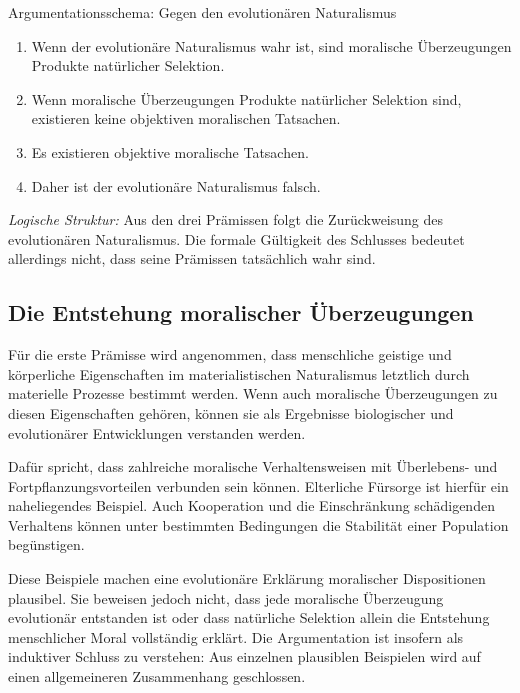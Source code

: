 \documentclass[a4paper,11pt]{article}
\begin{document}
	\begin{mathbox}{Argumentationsschema: Gegen den evolutionären Naturalismus}
		\begin{enumerate}[label=(\arabic*)]
			\item Wenn der evolutionäre Naturalismus wahr ist, sind moralische
			Überzeugungen Produkte natürlicher Selektion.
			\item Wenn moralische Überzeugungen Produkte natürlicher Selektion
			sind, existieren keine objektiven moralischen Tatsachen.
			\item Es existieren objektive moralische Tatsachen.
			\item Daher ist der evolutionäre Naturalismus falsch.
		\end{enumerate}
		
		\textit{Logische Struktur:} Aus den drei Prämissen folgt die
		Zurückweisung des evolutionären Naturalismus. Die formale
		Gültigkeit des Schlusses bedeutet allerdings nicht, dass seine
		Prämissen tatsächlich wahr sind.
	\end{mathbox}
	
	\subsection{Die Entstehung moralischer Überzeugungen}
	
	Für die erste Prämisse wird angenommen, dass menschliche geistige
	und körperliche Eigenschaften im materialistischen Naturalismus
	letztlich durch materielle Prozesse bestimmt werden. Wenn auch
	moralische Überzeugungen zu diesen Eigenschaften gehören, können
	sie als Ergebnisse biologischer und evolutionärer Entwicklungen
	verstanden werden.
	
	Dafür spricht, dass zahlreiche moralische Verhaltensweisen mit
	Überlebens- und Fortpflanzungsvorteilen verbunden sein können.
	Elterliche Fürsorge ist hierfür ein naheliegendes Beispiel.
	Auch Kooperation und die Einschränkung schädigenden Verhaltens
	können unter bestimmten Bedingungen die Stabilität einer Population
	begünstigen.
	
	Diese Beispiele machen eine evolutionäre Erklärung moralischer
	Dispositionen plausibel. Sie beweisen jedoch nicht, dass jede
	moralische Überzeugung evolutionär entstanden ist oder dass
	natürliche Selektion allein die Entstehung menschlicher Moral
	vollständig erklärt. Die Argumentation ist insofern als induktiver
	Schluss zu verstehen: Aus einzelnen plausiblen Beispielen wird
	auf einen allgemeineren Zusammenhang geschlossen.
	
\end{document}
